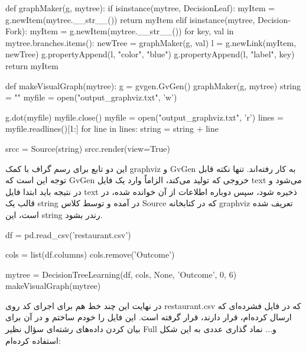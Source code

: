 \documentclass[12pt,titlepage,a4page , tikz , multi,table , svgnames,xcdraw]{article}
\begin{document}
   \begin{latin}
\begin{python}[language=Python]

def graphMaker(g, mytree):
    if isinstance(mytree, DecisionLeaf):
        myItem = g.newItem(mytree.__str__())
        return myItem
    elif isinstance(mytree, DecisionFork):
        myItem = g.newItem(mytree.__str__())
        for key, val in mytree.branches.items():
            newTree = graphMaker(g, val)
            l = g.newLink(myItem, newTree)
            g.propertyAppend(l, "color", "blue")
            g.propertyAppend(l, "label", key)
        return myItem


def makeVisualGraph(mytree):
    g = gvgen.GvGen()
    graphMaker(g, mytree)
    string = ""
    myfile = open("output_graphviz.txt", 'w')

    g.dot(myfile)
    myfile.close()
    myfile = open("output_graphviz.txt", 'r')
    lines = myfile.readlines()[1:]
    for line in lines:
        string = string + line

    srcc = Source(string)
    srcc.render(view=True)

\end{python}

\end{latin}

این دو تابع برای رسم گراف با کمک graphviz و GvGen به کار رفته‌اند. تنها نکته قابل توجه این است که GvGen خروجی که تولید می‌کند، الزاماً وارد یک فایل text می‌شود و در نتیجه باید ابتدا فایل text ذخیره شود، سپس دوباره اطلاعات از آن خوانده شده، در قالب یک string در آمده و توسط کلاس Source که در کتابخانه graphviz تعریف شده است، این string رندر بشود.

\newpage


   \begin{latin}
\begin{python}[language=Python]

df = pd.read_csv('restaurant.csv')

cols = list(df.columns)
cols.remove('Outcome')

mytree = DecisionTreeLearning(df, cols, None, 'Outcome', 0, 6)
makeVisualGraph(mytree)

\end{python}

\end{latin}

در نهایت این چند خط هم برای اجرای کد روی restaurant.csv که در فایل فشرده‌ای که ارسال کرده‌ام، قرار دارند، قرار گرفته است. این فایل را خودم ساختم و در آن برای بیان کردن داده‌های رشته‌ای سؤال نظیر Full و... نماد گذاری عددی به این شکل استفاده کرده‌ام:
\end{document}

